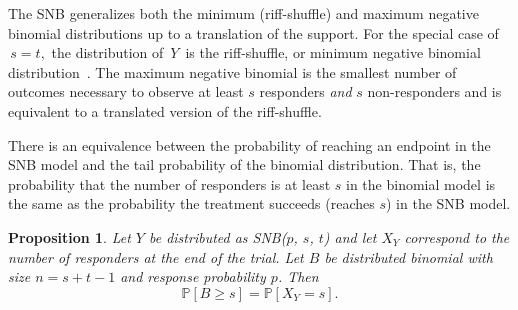 \documentclass[review]{elsarticle}
\newtheorem{prop}{Proposition}
\begin{document}
The SNB generalizes both the minimum (riff-shuffle) and maximum negative
binomial distributions up to a translation of the support.
For the special case of $\,s=t,$ the distribution of $\,Y\,$ is the
riff-shuffle, or minimum negative binomial 
distribution~\citep{Uppuluri1967,Johnson2005}.
The maximum negative binomial \cite{Zhang2000,Zelterman2005,Johnson2005} is 
the smallest number of outcomes necessary to 
observe at least $s$ responders {\em and} $s$ non-responders and is equivalent
to a translated version of the riff-shuffle. 


There is an equivalence between the probability of reaching an endpoint 
in the SNB model and the tail probability of the binomial distribution.
That is, the probability that the number of responders is at least $s$ in the 
binomial model is the same as the probability the treatment succeeds 
(reaches $s$) in the SNB 
model.
\begin{prop} \label{binomial_tail}
Let $Y$ be distributed as SNB($p$, $s$, $t$) and let $X_Y$ correspond
to the number of responders at the end of the trial. Let 
$B$ be distributed binomial with size $n=s+t-1$ and response probability
$p$. Then
\begin{equation}
\mathbb{P}[B \geq s] = \mathbb{P} [X_Y = s].
\end{equation}
\end{prop}
\end{document}

